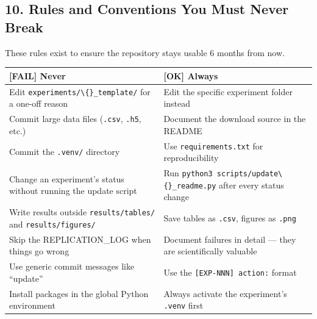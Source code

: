 \subsection{10. Rules and Conventions You Must Never
Break}\label{rules-and-conventions-you-must-never-break}

These rules exist to ensure the repository stays usable 6 months from
now.

{\def\LTcaptype{none} %
\small
\begin{longtable}[]{@{}
  >{\raggedright\arraybackslash}p{}
  >{\raggedright\arraybackslash}p{}@{}}
\toprule\noalign{}
\begin{minipage}[b]{\linewidth}\raggedright
{[}FAIL{]} Never
\end{minipage} & \begin{minipage}[b]{\linewidth}\raggedright
{[}OK{]} Always
\end{minipage} \\
\midrule\noalign{}
\endhead
\bottomrule\noalign{}
\endlastfoot
Edit \texttt{experiments/\textbackslash\{\}\_template/} for a one-off
reason & Edit the specific experiment folder instead \\
Commit large data files (\texttt{.csv},
\texttt{.h5}, etc.) & Document the download source in
the README \\
Commit the \texttt{.venv/} directory & Use
\texttt{requirements.txt} for reproducibility \\
Change an experiment's status without running the update script & Run
\texttt{python3 scripts/update\textbackslash\{\}\_readme.py} after every
status change \\
Write results outside \texttt{results/tables/} and
\texttt{results/figures/} & Save tables as
\texttt{.csv}, figures as
\texttt{.png} \\
Skip the REPLICATION\_LOG when things go wrong & Document failures in
detail --- they are scientifically valuable \\
Use generic commit messages like ``update'' & Use the
\texttt{[EXP-NNN] action:} format \\
Install packages in the global Python environment & Always activate the
experiment's \texttt{.venv} first \\
\end{longtable}
}
